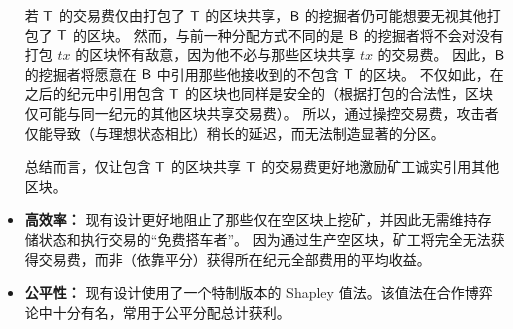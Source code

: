 \begin{itemize}
		若 $\textsf{T}$ 的交易费仅由打包了 $\textsf{T}$ 的区块共享，$\textsf{B}$ 的挖掘者仍可能想要无视其他打包了 $\textsf{T}$ 的区块。
		然而，与前一种分配方式不同的是 $\textsf{B}$ 的挖掘者将不会对没有打包 $tx$ 的区块怀有敌意，因为他不必与那些区块共享 $tx$ 的交易费。
		因此，$\textsf{B}$ 的挖掘者将愿意在 $\textsf{B}$ 中引用那些他接收到的不包含 $\textsf{T}$ 的区块。
		不仅如此，在之后的纪元中引用包含 $\textsf{T}$ 的区块也同样是安全的（根据打包的合法性，区块仅可能与同一纪元的其他区块共享交易费）。
		所以，通过操控交易费，攻击者仅能导致（与理想状态相比）稍长的延迟，而无法制造显著的分区。

		总结而言，仅让包含 $\textsf{T}$ 的区块共享 $\textsf{T}$ 的交易费更好地激励矿工诚实引用其他区块。

		\item {\bf 高效率：} 
		现有设计更好地阻止了那些仅在空区块上挖矿，并因此无需维持存储状态和执行交易的“免费搭车者”。
		因为通过生产空区块，矿工将完全无法获得交易费，而非（依靠平分）获得所在纪元全部费用的平均收益。

		\item {\bf 公平性：}
		现有设计使用了一个特制版本的 Shapley 值法。该值法在合作博弈论中十分有名，常用于公平分配总计获利。
	\end{itemize}




